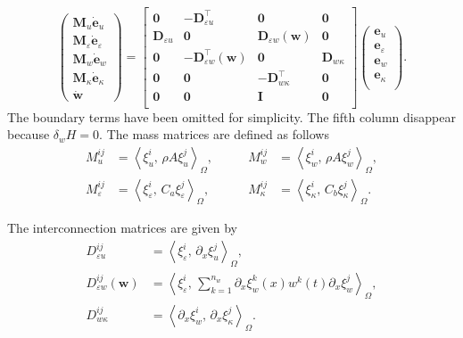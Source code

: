 \documentclass{ifacconf}
\newcommand{\inner}[3][]{\ensuremath{\left\langle #2, \, #3 \right\rangle_{#1}}}
\begin{document}
\begin{equation}\label{eq:findimSys}
\begin{pmatrix}
	\mathbf{M}_u \dot{\mathbf{e}}_u \\
	\mathbf{M}_\varepsilon \dot{\mathbf{e}}_\varepsilon \\
	\mathbf{M}_w \dot{\mathbf{e}}_w \\
	\mathbf{M}_\kappa \dot{\mathbf{e}}_\kappa \\
	 \dot{\mathbf{w}}
\end{pmatrix} = 
\begin{bmatrix}
	\mathbf{0} & -\mathbf{D}_{\varepsilon u}^\top & \mathbf{0} & \mathbf{0}  \\
	\mathbf{D}_{\varepsilon u} & \mathbf{0} & \mathbf{D}_{\varepsilon w}(\mathbf{w}) & \mathbf{0}  \\
	\mathbf{0} & -\mathbf{D}_{\varepsilon w}^\top(\mathbf{w}) & \mathbf{0} & \mathbf{D}_{w \kappa} \\
	\mathbf{0} & \mathbf{0} & -\mathbf{D}_{w \kappa}^\top & \mathbf{0}  \\
	\mathbf{0} & \mathbf{0} & \mathbf{I} & \mathbf{0} \\ 
\end{bmatrix}
\begin{pmatrix}
	\mathbf{e}_u \\
	\mathbf{e}_\varepsilon \\
	\mathbf{e}_w \\
	\mathbf{e}_\kappa \\
\end{pmatrix}.
\end{equation}
The boundary terms have been omitted for simplicity. The fifth column disappear because $\delta_w H=0$. The mass matrices are defined as follows
\begin{equation}
	\begin{aligned}
	M_u^{ij} &= \inner[\Omega]{\xi_u^i}{\rho A \xi_u^j}, \\
	M_\varepsilon^{ij} &= \inner[\Omega]{\xi_\varepsilon^i}{C_a \xi_\varepsilon^j}, 
	\end{aligned} \qquad 
	\begin{aligned}
	M_w^{ij} &= \inner[\Omega]{\xi_w^i}{\rho A \xi_w^j}, \\
	M_\kappa^{ij} &= \inner[\Omega]{\xi_\kappa^i}{C_b \xi_\kappa^j}.
	\end{aligned}
\end{equation}

The interconnection matrices are given by 
\begin{equation}
	\begin{aligned}
	D_{\varepsilon u}^{ij} &= \inner[\Omega]{\xi_\varepsilon^i}{\partial_x \xi_u^j}, \\
	D_{\varepsilon w}^{ij}(\mathbf{w}) &= \inner[\Omega]{\xi_\varepsilon^i}{ \sum_{k=1}^{n_w} \partial_x \xi_w^k(x) w^k(t) \partial_x \xi_w^j}, \\
	D_{w \kappa}^{ij} &= \inner[\Omega]{\partial_x \xi_w^i}{\partial_x \xi_\kappa^j}.
	\end{aligned}
\end{equation}
\end{document}

